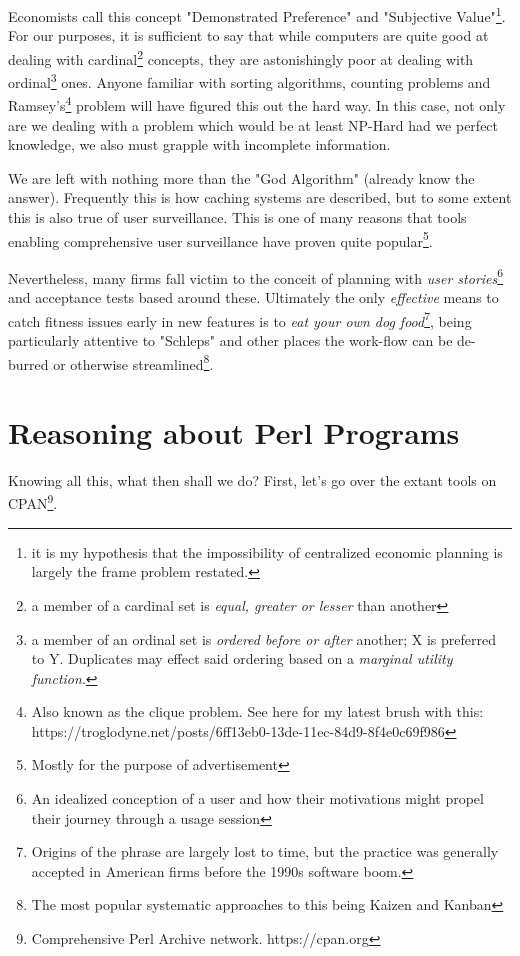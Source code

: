 \documentclass{article}
\begin{document}
Economists call this concept "Demonstrated Preference" and "Subjective Value"\cite{mises1}\footnote{it is my hypothesis that the impossibility of centralized economic planning \cite{mises2} is largely the frame problem restated.}.
For our purposes, it is sufficient to say that while computers are quite good at dealing with cardinal\footnote{a member of a cardinal set is \textit{equal, greater or lesser} than another} concepts,
they are astonishingly poor at dealing with ordinal\footnote{a member of an ordinal set is \textit{ordered before or after} another; X is preferred to Y.  Duplicates may effect said ordering based on a \textit{marginal utility function}.} ones.
Anyone familiar with sorting algorithms, counting problems and Ramsey's\footnote{Also known as the clique problem. See here for my latest brush with this: https://troglodyne.net/posts/6ff13eb0-13de-11ec-84d9-8f4e0c69f986} problem will have figured this out the hard way.
In this case, not only are we dealing with a problem which would be at least NP-Hard had we perfect knowledge, we also must grapple with incomplete information.

We are left with nothing more than the "God Algorithm" (already know the answer). \cite{atwood}
Frequently this is how caching systems are described, but to some extent this is also true of user surveillance.
This is one of many reasons that tools enabling comprehensive user surveillance have proven quite popular\footnote{Mostly for the purpose of advertisement}.

Nevertheless, many firms fall victim to the conceit of planning with \textit{user stories}\footnote{An idealized conception of a user and how their motivations might propel their journey through a usage session} and acceptance tests based around these.
Ultimately the only \textit{effective} means to catch fitness issues early in new features is to \textit{eat your own dog food}\footnote{Origins of the phrase are largely lost to time, but the practice was generally accepted in American firms before the 1990s software boom.},
being particularly attentive to "Schleps" \cite{schlep} and other places the work-flow can be de-burred or otherwise streamlined\footnote{The most popular systematic approaches to this being Kaizen and Kanban}.

\section{Reasoning about Perl Programs}

Knowing all this, what then shall we do?
First, let's go over the extant tools on CPAN\footnote{Comprehensive Perl Archive network.  https://cpan.org}.
\end{document}
